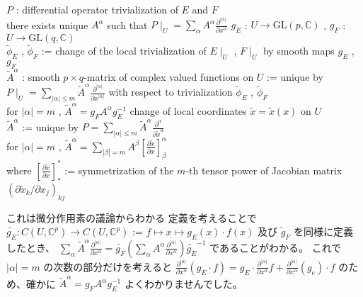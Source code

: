\begin{Theorem}
\itemwhen
  \Fix \(P\) : differential operator
\itemprop
  \For trivialization of \(E\) and \(F\) \\
  \Then there exists unique \(A^{\alpha}\) such that \(P \mid _U = \sum_{\alpha} A^\alpha \frac{\partial ^{|\alpha|}}{\partial x^\alpha}\)
\itemprop
  \For \(g_E\) : \(U \to \text{GL}(p,\mathbb{C})\) , \(g_F\) : \(U \to \text{GL}(q,\mathbb{C})\) \\
  \Let \(\tilde{\phi}_E\) , \(\tilde{\phi}_F\) := change of the local trivialization of \(E \mid _U\) , \(F \mid _U\) by smooth maps \(g_E\) , \(g_F\) \\
  \Let \(\tilde{A}^\alpha\) : smooth \(p \times q\)-matrix of complex valued functions on \(U\) := unique by \\
  \(P \mid _U = \sum_{|\alpha| \leq m} \tilde{A}^\alpha \frac{\partial^{|\alpha|}}{\partial x^{|\alpha|}}\) with respect to trivialization \(\tilde{\phi}_E\) , \(\tilde{\phi}_F\) \\
  \Then for \(|\alpha| = m\) , \(\tilde{A}^{\alpha} = g_F A^{\alpha} g_E^{-1}\)
\itemprop
  \For change of local coordinates \(\tilde{x}= \tilde{x}(x)\) on \(U\) \\
  \Let \(\tilde{A}^{\alpha}\) := unique by \(P = \sum_{|\alpha| \leq m} \tilde{A}^{\alpha} \frac{\partial^{\alpha}}{\partial \tilde{x}^{\alpha}}\) \\
  \Then for \(|\alpha| = m\) , \(\tilde{A}^{\alpha} = \sum_{| \beta | = m} A^{\beta} \left[\frac{\partial \tilde{x}}{\partial x}\right]^{\alpha}_{\beta}\) \\
  where \(\left[ \frac{\partial \tilde{x}}{\partial x}\right]^*_*\) := symmetrization of the \(m\)-th tensor power of Jacobian matrix \((\partial \tilde{x}_k / \partial x_j)_{kj}\)
\end{Theorem}

\begin{Proof}
\itemprof
  これは微分作用素の議論からわかる
\itemprof
  定義を考えることで \(\tilde{g_E}: C(U , \mathbb{C}^p) \to C(U , \mathbb{C}^p)\) := \(f \mapsto x \mapsto g_E(x) \cdot f(x)\) 及び \(\tilde{g}_F\) を同様に定義したとき、 \(\sum_{\alpha} \tilde{A}^\alpha \frac{\partial ^{|\alpha|}}{\partial x^\alpha} = \tilde{g_F} (\sum_{\alpha} A^\alpha \frac{\partial ^{|\alpha|}}{\partial x^\alpha}) \tilde{g_E}^{-1}\) であることがわかる。
  これで \(| \alpha | = m\) の次数の部分だけを考えると \(\frac{\partial ^|\alpha|}{\partial x^\alpha} (g_E \cdot f) = g_E \cdot \frac{\partial ^{|\alpha|}}{\partial x^\alpha} f + \frac{\partial ^{|\alpha|}}{\partial x^\alpha} (g_e) \cdot f\) のため、確かに \(\tilde{A}^\alpha = g_F A^\alpha g_E ^{-1}\)
\itemprof
  \WIP
  よくわかりませんでした。
\end{Proof}

